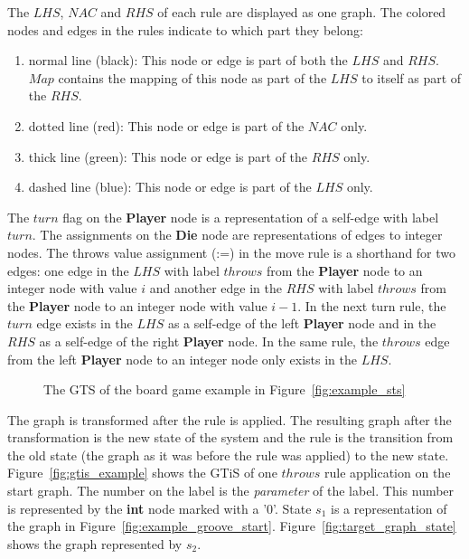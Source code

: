 The $\mathit{LHS}$, $\mathit{NAC}$ and $\mathit{RHS}$ of each rule are displayed as one graph. The colored nodes and edges in the rules indicate to which part they belong:
\begin{enumerate}
  \item normal line (black): This node or edge is part of both the $\mathit{LHS}$ and $\mathit{RHS}$. $\mathit{Map}$ contains the mapping of this node as part of the $\mathit{LHS}$ to itself as part of the $\mathit{RHS}$.
  \item dotted line (red): This node or edge is part of the $\mathit{NAC}$ only.
  \item thick line (green): This node or edge is part of the $\mathit{RHS}$ only.
  \item dashed line (blue): This node or edge is part of the $\mathit{LHS}$ only.
\end{enumerate}

The $turn$ flag on the \textbf{Player} node is a representation of a self-edge with label $turn$. The assignments on the \textbf{Die} node are representations of edges to integer nodes. The throws value assignment (:=) in the move rule is a shorthand for two edges: one edge in the $\mathit{LHS}$ with label $throws$ from the \textbf{Player} node to an integer node with value $i$ and another edge in the $\mathit{RHS}$ with label $throws$ from the \textbf{Player} node to an integer node with value $i-1$. In the next turn rule, the $turn$ edge exists in the $\mathit{LHS}$ as a self-edge of the left \textbf{Player} node and in the $\mathit{RHS}$ as a self-edge of the right \textbf{Player} node. In the same rule, the $throws$ edge from the left \textbf{Player} node to an integer node only exists in the $\mathit{LHS}$.

\begin{figure}[h!]
  \begin{center}
    \quad
  \end{center}
  \caption{The GTS of the board game example in Figure~\ref{fig:example_sts}}
  \label{fig:example_groove}
\end{figure}

The graph is transformed after the rule is applied. The resulting graph after the transformation is the new state of the system and the rule is the transition from the old state (the graph as it was before the rule was applied) to the new state. Figure~\ref{fig:gtis_example} shows the GTiS of one $throws$ rule application on the start graph. The number on the label is the \textit{parameter} of the label. This number is represented by the \textbf{int} node marked with a '0'. State $s_1$ is a representation of the graph in Figure~\ref{fig:example_groove_start}. Figure~\ref{fig:target_graph_state} shows the graph represented by $s_2$. 

